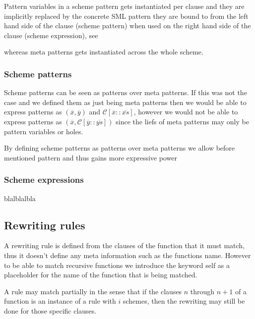 Pattern variables in a scheme pattern gets instantiated per clause and they are
implicitly replaced by the concrete SML pattern they are bound to from the left
hand side of the clause (scheme pattern) when used on the right hand side of the
clause (scheme expression), see 

whereas meta patterns gets instantiated across the whole
scheme.


\subsubsection{Scheme patterns}
Scheme patterns can be seen as patterns over meta patterns. If this was not the
case and we defined them as just being meta patterns then we would be able to
express patterns as $(\overline{x}, \overline{y})$ and $\mathcal{C}[\overline{x}
:: \overline{xs}]$, however we would not be able to express patterns as
$(\overline{x}, \mathcal{C}[\overline{y} :: \overline{ys}])$ since the liefs of
meta patterns may only be pattern variables or holes.

By defining scheme patterns as patterns over meta patterns we allow before
mentioned pattern and thus gains more expressive power

\subsubsection{Scheme expressions}
blalblalbla

\subsection{Rewriting rules}



A rewriting rule is defined from the clauses of the function that it must match,
thus it doesn't define any meta information such as the functions name. However
to be able to match recursive functions we introduce the keyword \textsf{self}
as a placeholder for the name of the function that is being matched.


A rule may match partially in the sense that if the clauses $n$ through $n+1$ of
a function is an instance of a rule with $i$ schemes, then the rewriting may still be
done for those specific clauses.

